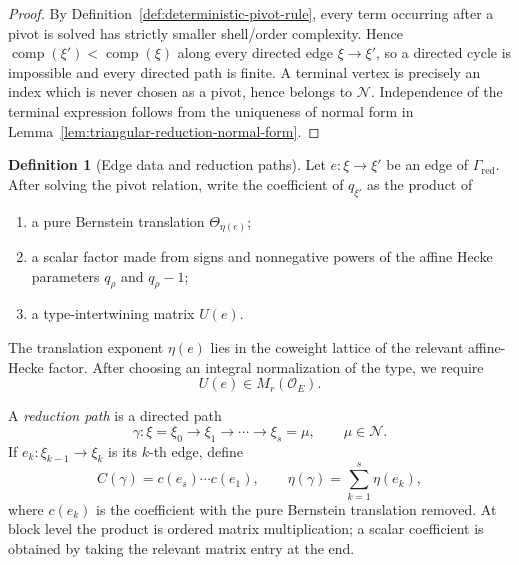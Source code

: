 \documentclass[12pt]{article}
\theoremstyle{definition}
\newtheorem{definition}[theorem]{Definition}
\theoremstyle{remark}
\newcommand{\Ocoeff}{\mathcal O_E}
\begin{document}
\begin{proof}
By Definition~\ref{def:deterministic-pivot-rule}, every term occurring after
a pivot is solved has strictly smaller shell/order complexity.  Hence
\(\operatorname{comp}(\xi')<\operatorname{comp}(\xi)\) along every directed
edge \(\xi\to\xi'\), so a directed cycle is impossible and every directed
path is finite.  A terminal vertex is precisely an index which is never
chosen as a pivot, hence belongs to \(\mathscr N\).  Independence of the
terminal expression follows from the uniqueness of normal form in
Lemma~\ref{lem:triangular-reduction-normal-form}.
\end{proof}

\begin{definition}[Edge data and reduction paths]
\label{def:global-reduction-path}
Let \(e:\xi\to\xi'\) be an edge of
\(\Gamma_{\mathrm{red}}\).  After solving the pivot relation, write the
coefficient of \(q_{\xi'}\) as the product of
\begin{enumerate}
 \item a pure Bernstein translation \(\Theta_{\eta(e)}\);
 \item a scalar factor made from signs and nonnegative powers of the affine
 Hecke parameters \(q_\rho\) and \(q_\rho-1\);
 \item a type-intertwining matrix \(U(e)\).
\end{enumerate}
The translation exponent \(\eta(e)\) lies in the coweight lattice of the
relevant affine-Hecke factor.  After choosing an integral normalization of
the type, we require
\[
 U(e)\in M_r(\Ocoeff).
\]

A \emph{reduction path} is a directed path
\[
 \gamma:
 \xi=\xi_0\longrightarrow\xi_1\longrightarrow\cdots
 \longrightarrow\xi_s=\mu,
 \qquad \mu\in\mathscr N.
\]
If \(e_k:\xi_{k-1}\to\xi_k\) is its \(k\)-th edge, define
\begin{equation}\label{eq:path-C-and-eta}
 C(\gamma)=c(e_s)\cdots c(e_1),
 \qquad
 \eta(\gamma)=\sum_{k=1}^s\eta(e_k),
\end{equation}
where \(c(e_k)\) is the coefficient with the pure Bernstein translation
removed.  At block level the product is ordered matrix multiplication; a
scalar coefficient is obtained by taking the relevant matrix entry at the
end.
\end{definition}
\end{document}
